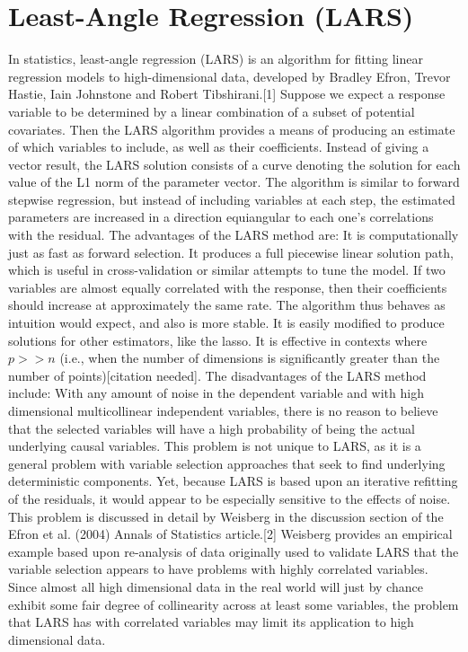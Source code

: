 \documentclass[MASTER.tex]{subfiles}
\begin{document}
\section{Least-Angle Regression (LARS)}

In statistics, least-angle regression (LARS) is an algorithm for fitting linear regression models to high-dimensional data, developed by Bradley Efron, Trevor Hastie, Iain Johnstone and Robert Tibshirani.[1]
Suppose we expect a response variable to be determined by a linear combination of a subset of potential covariates. Then the LARS algorithm provides a means of producing an estimate of which variables to include, as well as their coefficients.
Instead of giving a vector result, the LARS solution consists of a curve denoting the solution for each value of the L1 norm of the parameter vector. The algorithm is similar to forward stepwise regression, but instead of including variables at each step, the estimated parameters are increased in a direction equiangular to each one's correlations with the residual.
The advantages of the LARS method are:
It is computationally just as fast as forward selection.
It produces a full piecewise linear solution path, which is useful in cross-validation or similar attempts to tune the model.
If two variables are almost equally correlated with the response, then their coefficients should increase at approximately the same rate. The algorithm thus behaves as intuition would expect, and also is more stable.
It is easily modified to produce solutions for other estimators, like the lasso.
It is effective in contexts where $p >> n$ (i.e., when the number of dimensions is significantly greater than the number of points)[citation needed].
The disadvantages of the LARS method include:
With any amount of noise in the dependent variable and with high dimensional multicollinear independent variables, there is no reason to believe that the selected variables will have a high probability of being the actual underlying causal variables. This problem is not unique to LARS, as it is a general problem with variable selection approaches that seek to find underlying deterministic components. Yet, because LARS is based upon an iterative refitting of the residuals, it would appear to be especially sensitive to the effects of noise. This problem is discussed in detail by Weisberg in the discussion section of the Efron et al. (2004) Annals of Statistics article.[2] Weisberg provides an empirical example based upon re-analysis of data originally used to validate LARS that the variable selection appears to have problems with highly correlated variables.
Since almost all high dimensional data in the real world will just by chance exhibit some fair degree of collinearity across at least some variables, the problem that LARS has with correlated variables may limit its application to high dimensional data.
\end{document}
